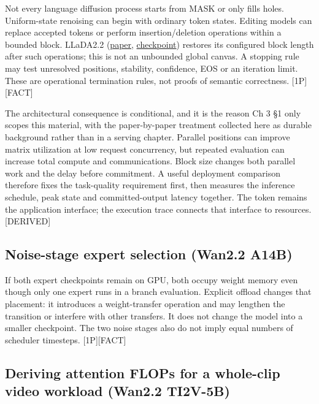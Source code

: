Not every language diffusion process starts from MASK or only fills
holes. Uniform-state renoising can begin with ordinary token states.
Editing models can replace accepted tokens or perform insertion/deletion
operations within a bounded block. LLaDA2.2
(\href{https://arxiv.org/abs/2602.08676}{paper},
\href{https://huggingface.co/inclusionAI/LLaDA2.2-flash}{checkpoint})
restores its configured block length after such operations; this is not
an unbounded global canvas. A stopping rule may test unresolved
positions, stability, confidence, EOS or an iteration limit. These are
operational termination rules, not proofs of semantic correctness.
\mbox{{[}1P{]}}\hspace{0pt}\mbox{{[}FACT{]}}

The architectural consequence is conditional, and it is the reason Ch 3
§1 only scopes this material, with the paper-by-paper treatment
collected here as durable background rather than in a serving chapter.
Parallel positions can improve matrix utilization at low request
concurrency, but repeated evaluation can increase total compute and
communications. Block size changes both parallel work and the delay
before commitment. A useful deployment comparison therefore fixes the
task-quality requirement first, then measures the inference schedule,
peak state and committed-output latency together. The token remains the
application interface; the execution trace connects that interface to
resources. \mbox{{[}DERIVED{]}}

\subsection{Noise-stage expert selection (Wan2.2
A14B)}\label{noise-stage-expert-selection-wan2.2-a14b}

If both expert checkpoints remain on GPU, both occupy weight memory even
though only one expert runs in a branch evaluation. Explicit offload
changes that placement: it introduces a weight-transfer operation and
may lengthen the transition or interfere with other transfers. It does
not change the model into a smaller checkpoint. The two noise stages
also do not imply equal numbers of scheduler timesteps.
\mbox{{[}1P{]}}\hspace{0pt}\mbox{{[}FACT{]}}

\subsection{Deriving attention FLOPs for a whole-clip video workload
(Wan2.2
TI2V-5B)}\label{deriving-attention-flops-for-a-whole-clip-video-workload-wan2.2-ti2v-5b}

